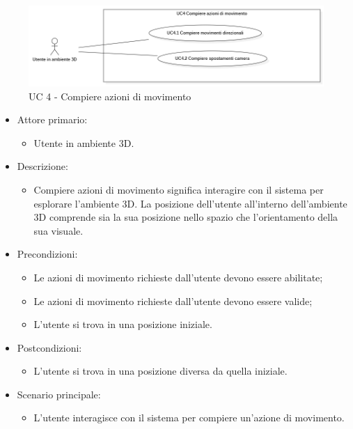 \begin{figure}[H]
  \renewcommand{\thefigure}{5}
  \includegraphics[width=\linewidth]{./res/images/UC4.png}
  \caption{UC 4 - Compiere azioni di movimento}
  \label{fig:UC 4}
\end{figure}

\begin{itemize}

	\item Attore primario: 
	\begin{itemize}
		\item Utente in ambiente 3D.
	\end{itemize}
	\item Descrizione:
	\begin{itemize}
		\item Compiere azioni di movimento significa interagire con il sistema per esplorare l'ambiente 3D.
\newline La posizione dell'utente all'interno dell'ambiente 3D comprende sia la sua posizione nello spazio che l'orientamento
della sua visuale.
	\end{itemize}
	
	\item Precondizioni:
	\begin{itemize}
		\item Le azioni di movimento richieste dall'utente devono essere abilitate;
		\item Le azioni di movimento richieste dall'utente devono essere valide;
		\item L'utente si trova in una posizione iniziale.
	\end{itemize}
	
	\item Postcondizioni:
	\begin{itemize}
		\item L'utente si trova in una posizione diversa da quella iniziale.
	\end{itemize}
	
	\item Scenario principale:
	\begin{itemize}
		\item L'utente interagisce con il sistema per compiere un'azione di movimento.
	\end{itemize}
	
\end{itemize}

